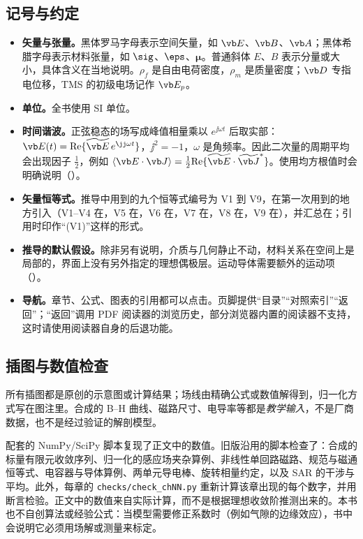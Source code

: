 \subsection*{记号与约定}\label{front:notation}
\begin{itemize}
\item \textbf{矢量与张量。}黑体罗马字母表示空间矢量，如 $\vb E$、$\vb B$、$\vb A$；黑体希腊字母表示材料张量，如 $\sig$、$\eps$、$\boldsymbol\mu$。普通斜体 $E$、$B$ 表示分量或大小，具体含义在当地说明。$\rho_f$ 是自由电荷密度，$\rho_m$ 是质量密度；$\vb D$ 专指电位移，TMS 的初级电场记作 $\vb E_p$。
\item \textbf{单位。}全书使用 SI 单位。
\item \textbf{时间谐波。}正弦稳态的场写成峰值相量乘以 $e^{\jj\omega t}$ 后取实部：$\vb E(t)=\mathrm{Re}\{\widetilde{\vb E}\,e^{\jj\omega t}\}$，$\jj^2=-1$，$\omega$ 是角频率。因此二次量的周期平均会出现因子 $\tfrac12$，例如 $\langle\vb E\cdot\vb J\rangle=\tfrac12\mathrm{Re}\{\widetilde{\vb E}\cdot\widetilde{\vb J}^{*}\}$。使用均方根值时会明确说明（）。
\item \textbf{矢量恒等式。}推导中用到的九个恒等式编号为 V1 到 V9，在第一次用到的地方引入（V1--V4 在，V5 在，V6 在，V7 在，V8 在，V9 在），并汇总在；引用时印作“(V1)”这样的形式。
\item \textbf{推导的默认假设。}除非另有说明，介质与几何静止不动，材料关系在空间上是局部的，界面上没有另外指定的理想偶极层。运动导体需要额外的运动项（）。
\item \textbf{导航。}章节、公式、图表的引用都可以点击。页脚提供“目录”“对照索引”“返回”；“返回”调用 PDF 阅读器的浏览历史，部分浏览器内置的阅读器不支持，这时请使用阅读器自身的后退功能。
\end{itemize}

\subsection*{插图与数值检查}
所有插图都是原创的示意图或计算结果；场线由精确公式或数值解得到，归一化方式写在图注里。合成的 B--H 曲线、磁路尺寸、电导率等都是\emph{教学输入}，不是厂商数据，也不是经过验证的解剖模型。

配套的 NumPy/SciPy 脚本复现了正文中的数值。旧版沿用的脚本检查了：合成的标量有限元收敛序列、归一化的感应场夹杂算例、非线性单回路磁路、规范与磁通恒等式、电容器与导体算例、两单元导电棒、旋转相量约定，以及 SAR 的干涉与平均。此外，每章的 \texttt{checks/check\_chNN.py} 重新计算该章出现的每个数字，并用断言检验。正文中的数值来自实际计算，而不是根据理想收敛阶推测出来的。本书也不自创算法或经验公式：当模型需要修正系数时（例如气隙的边缘效应），书中会说明它必须用场解或测量来标定。

